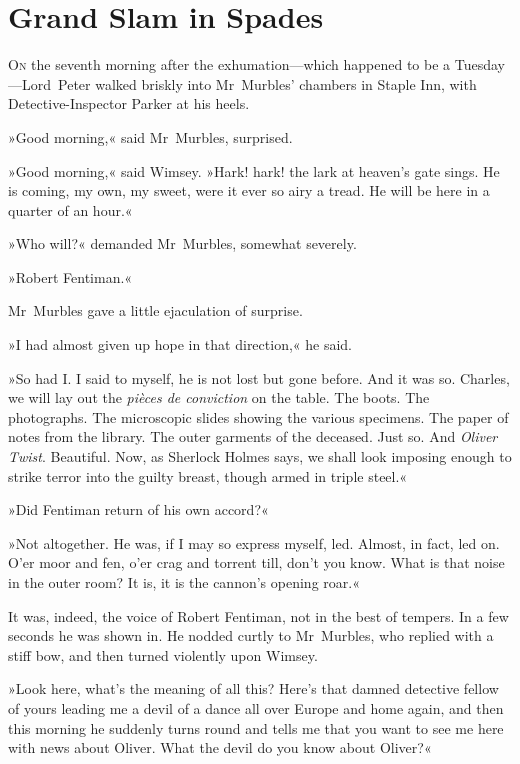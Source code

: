\chapter{Grand Slam in Spades}

\lettrine[lines=4]{O}{n} the seventh morning after the exhumation—which happen\-ed to be a Tuesday—Lord~Peter walked briskly into Mr~Murb\-les' chambers in Staple Inn, with Detective-Inspector Parker at his heels.

\zz
»Good morning,« said Mr~Murbles, surprised.

»Good morning,« said Wimsey. »Hark! hark! the lark at heaven's gate sings. He is coming, my own, my sweet, were it ever so airy a tread. He will be here in a quarter of an hour.«

»Who will?« demanded Mr~Murbles, somewhat severely.

»Robert Fentiman.«

Mr~Murbles gave a little ejaculation of surprise.

»I had almost given up hope in that direction,« he said.

»So had I\@. I said to myself, he is not lost but gone before. And it was so. Charles, we will lay out the \textit{pièces de conviction} on the table. The boots. The photographs. The microscopic slides showing the various specimens. The paper of notes from the library. The outer garments of the deceased. Just so. And \textit{Oliver Twist}. Beautiful. Now, as Sherlock Holmes says, we shall look imposing enough to strike terror into the guilty breast, though armed in triple steel.«

»Did Fentiman return of his own accord?«

»Not altogether. He was, if I may so express myself, led. Almost, in fact, led on. O'er moor and fen, o'er crag and torrent till, don't you know. What is that noise in the outer room? It is, it is the cannon's opening roar.«

It was, indeed, the voice of Robert Fentiman, not in the best of tempers. In a few seconds he was shown in. He nodded curtly to Mr~Murbles, who replied with a stiff bow, and then turned violently upon Wimsey.

»Look here, what's the meaning of all this? Here's that damned detective fellow of yours leading me a devil of a dance all over Europe and home again, and then this morning he suddenly turns round and tells me that you want to see me here with news about Oliver. What the devil do you know about Oliver?«

